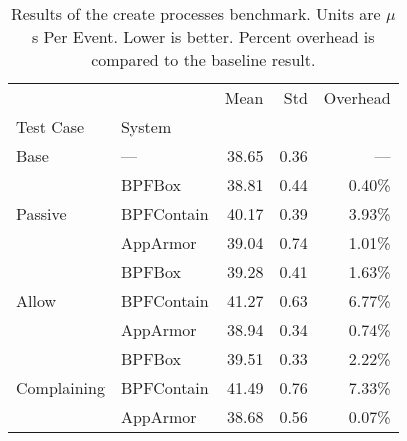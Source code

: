 \begin{table}[htp!]
\centering
\footnotesize
\caption[Results of the create processes benchmark]{Results of the create processes benchmark. Units are $\mu$s Per Event. Lower is better. Percent overhead is compared to the baseline result.}
\label{tab:phoronix-create-processes}
\begin{tabular}{llrrr}
\toprule
            &          &   Mean &   Std & Overhead \\
Test Case & System &        &       &          \\
\midrule
Base & --- &  38.65 &  0.36 &      --- \\
\cline{1-5}
\multirow{3}{*}{Passive} & BPFBox &  38.81 &  0.44 &   0.40\% \\
            & BPFContain &  40.17 &  0.39 &   3.93\% \\
            & AppArmor &  39.04 &  0.74 &   1.01\% \\
\cline{1-5}
\multirow{3}{*}{Allow} & BPFBox &  39.28 &  0.41 &   1.63\% \\
            & BPFContain &  41.27 &  0.63 &   6.77\% \\
            & AppArmor &  38.94 &  0.34 &   0.74\% \\
\cline{1-5}
\multirow{3}{*}{Complaining} & BPFBox &  39.51 &  0.33 &   2.22\% \\
            & BPFContain &  41.49 &  0.76 &   7.33\% \\
            & AppArmor &  38.68 &  0.56 &   0.07\% \\
\bottomrule
\end{tabular}
\end{table}
